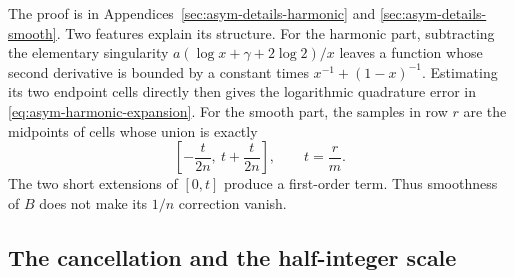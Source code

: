 The proof is in Appendices~\ref{sec:asym-details-harmonic} and
\ref{sec:asym-details-smooth}.  Two features explain its structure.
For the harmonic part, subtracting the elementary singularity
$a(\log x+\gamma+2\log2)/x$ leaves a function whose second
derivative is bounded by a constant times
$x^{-1}+(1-x)^{-1}$.  Estimating its two endpoint cells directly
then gives the logarithmic quadrature error in
\eqref{eq:asym-harmonic-expansion}.  For the smooth part, the samples
in row $r$ are the midpoints of cells whose union is exactly
\[
 \left[-\frac{t}{2n},\ t+\frac{t}{2n}\right],\qquad t=\frac rm.
\]
The two short extensions of $[0,t]$ produce a first-order term.
Thus smoothness of $B$ does not make its $1/n$ correction vanish.

\subsection{The cancellation and the half-integer scale}

